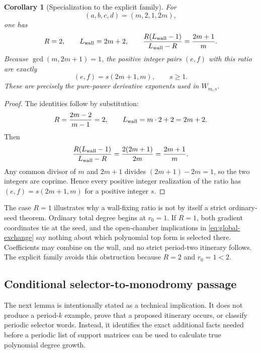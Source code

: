 \documentclass[11pt]{article}
\newtheorem{corollary}[theorem]{Corollary}
\theoremstyle{definition}
\theoremstyle{remark}
\begin{document}
\begin{corollary}[Specialization to the explicit family]
\label{cor:structural-specialization}
For
\[
(a,b,c,d)=(m,2,1,2m),
\]
one has
\[
R=2,\qquad L_{\mathrm{wall}}=2m+2,\qquad
\frac{R(L_{\mathrm{wall}}-1)}{L_{\mathrm{wall}}-R}=\frac{2m+1}{m}.
\]
Because \(\gcd(m,2m+1)=1\), the positive integer pairs \((e,f)\) with this
ratio are exactly
\[
(e,f)=s(2m+1,m),\qquad s\geq1.
\]
These are precisely the pure-power derivative exponents used in
\(W_{m,s}\).
\end{corollary}

\begin{proof}
The identities follow by substitution:
\[
R=\frac{2m-2}{m-1}=2,\qquad
L_{\mathrm{wall}}=m\cdot2+2=2m+2.
\]
Then
\[
\frac{R(L_{\mathrm{wall}}-1)}{L_{\mathrm{wall}}-R}
=\frac{2(2m+1)}{2m}=\frac{2m+1}{m}.
\]
Any common divisor of \(m\) and \(2m+1\) divides
\((2m+1)-2m=1\), so the two integers are coprime.  Hence every positive
integer realization of the ratio has \((e,f)=s(2m+1,m)\) for a positive
integer \(s\).
\end{proof}

The case \(R=1\) illustrates why a wall-fixing ratio is not by itself a
strict ordinary-seed theorem.  Ordinary total degree begins at
\(r_0=1\).  If \(R=1\), both gradient coordinates tie at the seed, and the
open-chamber implications in \eqref{eq:global-exchange} say nothing about
which polynomial top form is selected there.  Coefficients may combine on
the wall, and no strict period-two itinerary follows.  The explicit family
avoids this obstruction because \(R=2\) and \(r_0=1<2\).

\subsection{Conditional selector-to-monodromy passage}

The next lemma is intentionally stated as a technical implication.  It does
not produce a period-\(k\) example, prove that a proposed itinerary occurs,
or classify periodic selector words.  Instead, it identifies the exact
additional facts needed before a periodic list of support matrices can be
used to calculate true polynomial degree growth.
\end{document}
